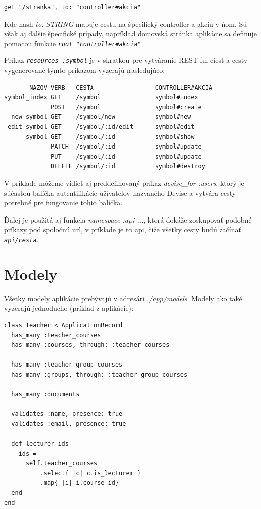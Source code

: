 \begin{verbatim}
get "/stranka", to: "controller#akcia"
\end{verbatim}

Kde hash \emph{to: STRING} mapuje cestu na špecifický controller a akciu v ňom. Sú však aj ďalšie špecifické prípady, napríklad domovská stránka aplikácie sa definuje pomocou funkcie \emph{\texttt{root "controller\#akcia"}}

Príkaz \emph{\texttt{resources :symbol}} je v skratkou pre vytváranie REST-ful ciest a cesty vygenerované týmto príkazom vyzerajú nasledujúco:

\begin{verbatim}
       NAZOV VERB   CESTA                 CONTROLLER#AKCIA
symbol_index GET    /symbol               symbol#index
             POST   /symbol               symbol#create
  new_symbol GET    /symbol/new           symbol#new
 edit_symbol GET    /symbol/:id/edit      symbol#edit
      symbol GET    /symbol/:id           symbol#show
             PATCH  /symbol/:id           symbol#update
             PUT    /symbol/:id           symbol#update
             DELETE /symbol/:id           symbol#destroy
\end{verbatim}

V príklade môžeme vidieť aj preddefinovaný príkaz \emph{devise\_for :users}, ktorý je súčasťou balíčka autentifikácie užívateľov nazvaného Devise a vytvára cesty potrebné pre fungovanie tohto balíčka.

Ďalej je použitá aj funkcia \emph{namespace :api ...}, ktorá dokáže zoskupovať podobné príkazy pod spoločnú url, v príklade je to api, čiže všetky cesty budú začínať \emph{\texttt{\/api/cesta}}.

\section{Modely}

Všetky modely aplikácie prebývajú v adresári \emph{./app/models}. Modely ako také vyzerajú jednoducho (príklad z aplikácie):

\begin{verbatim}
class Teacher < ApplicationRecord
  has_many :teacher_courses
  has_many :courses, through: :teacher_courses

  has_many :teacher_group_courses
  has_many :groups, through: :teacher_group_courses

  has_many :documents

  validates :name, presence: true
  validates :email, presence: true

  def lecturer_ids
    ids = 
      self.teacher_courses
          .select{ |c| c.is_lecturer }
          .map{ |i| i.course_id}
  end
end
\end{verbatim}

